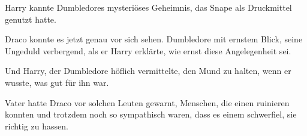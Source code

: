 Harry kannte Dumbledores mysteriöses Geheimnis, das Snape als Druckmittel genutzt hatte.

Draco konnte es jetzt genau vor sich sehen. Dumbledore mit ernstem Blick, seine Ungeduld verbergend, als er Harry erklärte, wie ernst diese Angelegenheit sei.

Und Harry, der Dumbledore höflich vermittelte, den Mund zu halten, wenn er wusste, was gut für ihn war.

Vater hatte Draco vor solchen Leuten gewarnt, Menschen, die einen ruinieren konnten und trotzdem noch so sympathisch waren, dass es einem schwerfiel, sie richtig zu hassen.

